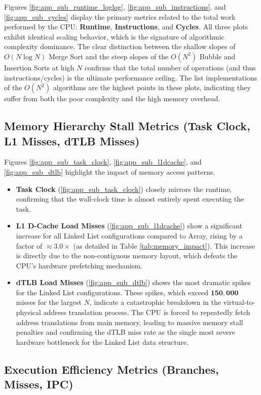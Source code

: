 \documentclass[11pt, a4paper]{article}
\begin{document}
Figures \ref{fig:app_sub_runtime_loglog}, \ref{fig:app_sub_instructions}, and \ref{fig:app_sub_cycles} display the primary metrics related to the total work performed by the CPU: \textbf{Runtime}, \textbf{Instructions}, and \textbf{Cycles}. All three plots exhibit identical scaling behavior, which is the signature of algorithmic complexity dominance. The clear distinction between the shallow slopes of $O(N \log N)$ Merge Sort and the steep slopes of the $O(N^2)$ Bubble and Insertion Sorts at high $N$ confirms that the total number of operations (and thus instructions/cycles) is the ultimate performance ceiling. The list implementations of the $O(N^2)$ algorithms are the highest points in these plots, indicating they suffer from both the poor complexity and the high memory overhead.

\subsection{Memory Hierarchy Stall Metrics (Task Clock, L1 Misses, dTLB Misses)}

Figures \ref{fig:app_sub_task_clock}, \ref{fig:app_sub_l1dcache}, and \ref{fig:app_sub_dtlb} highlight the impact of memory access patterns.
\begin{itemize}
    \item \textbf{Task Clock} (\ref{fig:app_sub_task_clock}) closely mirrors the runtime, confirming that the wall-clock time is almost entirely spent executing the task.
    \item \textbf{L1 D-Cache Load Misses} (\ref{fig:app_sub_l1dcache}) show a significant increase for all Linked List configurations compared to Array, rising by a factor of $\approx 3.0\times$ (as detailed in Table \ref{tab:memory_impact}). This increase is directly due to the non-contiguous memory layout, which defeats the CPU's hardware prefetching mechanism.
    \item \textbf{dTLB Load Misses} (\ref{fig:app_sub_dtlb}) shows the most dramatic spikes for the Linked List configurations. These spikes, which exceed $\mathbf{150,000}$ misses for the largest $N$, indicate a catastrophic breakdown in the virtual-to-physical address translation process. The CPU is forced to repeatedly fetch address translations from main memory, leading to massive memory stall penalties and confirming the dTLB miss rate as the single most severe hardware bottleneck for the Linked List data structure.
\end{itemize}

\subsection{Execution Efficiency Metrics (Branches, Misses, IPC)}
\end{document}
